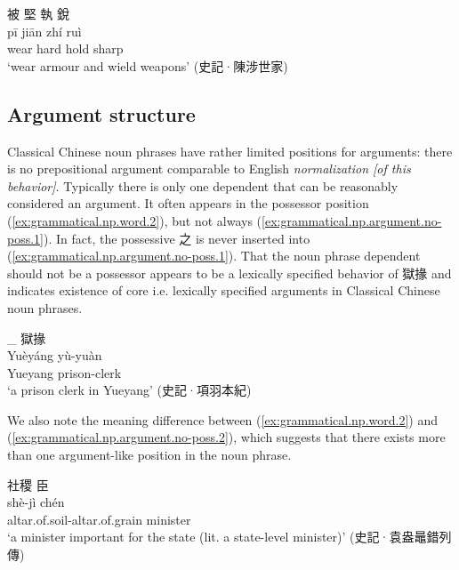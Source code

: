 \documentclass[UTF8, a4paper, oneside, scheme=plain, 12pt]{ctexrep}
\newcommand{\form}[1]{\emph{#1}}
\newcommand{\translate}[1]{`#1'}
\begin{document}
\begin{exe}
    \ex\label{ex:grammatical.np.nominalization.1}
    \glll
    被 堅 執 銳 \\
    pī jiān zhí ruì \\
    wear hard hold sharp \\
    \glt\translate{wear armour and wield weapons} \hfill (史記·陳涉世家)
\end{exe}

\subsection{Argument structure}

Classical Chinese noun phrases have rather limited positions for arguments:
there is no prepositional argument comparable to English \form{normalization [of this behavior]}.
Typically there is only one dependent that can be reasonably considered an argument.
It often appears in the possessor position (\ref{ex:grammatical.np.word.2}),
but not always (\ref{ex:grammatical.np.argument.no-poss.1}).
In fact, the possessive 之 is never inserted into (\ref{ex:grammatical.np.argument.no-poss.1}).
That the noun phrase dependent should not be a possessor appears to be a lexically specified behavior of 獄掾 and indicates existence of core i.e. lexically specified arguments in Classical Chinese noun phrases.

\begin{exe}
    \ex\label{ex:grammatical.np.argument.no-poss.1}
    \glll
    [櫟陽]_{} 獄掾 \\
    Yuèyáng yù-yuàn \\
    Yueyang prison-clerk \\
    \glt\translate{a prison clerk in Yueyang} \hfill (史記·項羽本紀)
\end{exe}

We also note the meaning difference between (\ref{ex:grammatical.np.word.2}) and (\ref{ex:grammatical.np.argument.no-poss.2}),
which suggests that there exists more than one argument-like position in the noun phrase.

\begin{exe}
    \ex\label{ex:grammatical.np.argument.no-poss.2}
    \glll
    社稷 臣 \\
    shè-jì chén \\
    altar.of.soil-altar.of.grain  minister \\
    \glt\translate{a minister important for the state (lit. a state-level minister)} \hfill (史記·袁盎鼂錯列傳)
\end{exe}
\end{document}
